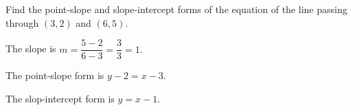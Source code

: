 


\begin{question}
	Find the point-slope and slope-intercept forms of the equation of the line passing through $(3, 2)$ and $(6, 5)$.
\end{question}

\begin{solution}
	The slope is $m=\dfrac{5-2}{6-3}=\dfrac33=1.$

	The point-slope form is 
	$y-2=x-3.$

	The slop-intercept form is 
	$y=x-1.$
\end{solution}